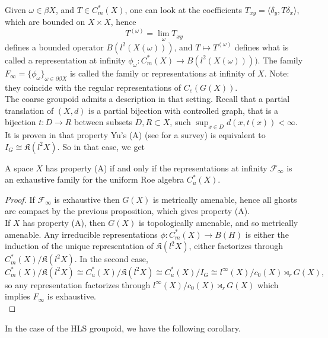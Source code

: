Given $\omega\in \beta X$, and $T\in C_m^*(X)$, one can look at the coefficients $T_{xy}= \langle \delta_y, T\delta_x\rangle$, which are bounded on $X\times X$, hence 
\[T^{(\omega)}=\lim_{\omega} T_{xy}\]
defines a bounded operator $B(l^2(X(\omega)))$, and $T\mapsto T^{(\omega)}$ defines what is called a representation at infinity $\phi_\omega : C_m^*(X)\rightarrow B(l^2(X(\omega))))$. The family $F_\infty=\{\phi_{\omega}\}_{\omega\in \partial \beta X}$ is called the family or representations at infinity of $X$. Note: they coincide with the regular representations of $C_c(G(X))$. \\

The coarse groupoid admits a description in that setting. Recall that a partial translation of $(X,d)$ is a partial bijection with controlled graph, that is a bijection $t: D\rightarrow R$ between subsets $D,R\subset X$, such $\sup_{x\in D} d(x,t(x))<\infty$. \\ 

It is proven in \cite{roe2014ghostbusting} that property Yu's (A) (see \cite{nowak2008property} for a survey) is equivalent to $I_G\cong \mathfrak K(l^2X)$. So in that case, we get
\begin{cor}
A space $X$ has property (A) if and only if the representations at infinity $\mathcal F_\infty$ is an exhaustive family for the uniform Roe algebra $C^*_u(X)$.
\end{cor}

\begin{proof}
If $\mathcal F_\infty$ is exhaustive then $G(X)$ is metrically amenable, hence all ghosts are compact by the previous proposition, which gives property (A).\\
If $X$ has property (A), then $G(X)$ is topologically amenable, and so metrically amenable. Any irreducible representations $\phi: C^*_m(X)\rightarrow B(H)$ is either the induction of the unique representation of $\mathfrak K(l^2X)$, either factorizes through $C^*_m(X)/\mathfrak K(l^2 X)$. In the second case, 
\[C^*_m(X)/\mathfrak K(l^2 X) \cong C^*_u(X) / \mathfrak K(l^2 X) \cong C^*_u(X) / I_G \cong l^\infty(X)/c_0(X) \rtimes_r G(X), \]
so any representation factorizes through $l^\infty(X)/c_0(X) \rtimes_r G(X)$ which implies $F_\infty $ is exhaustive.\\
\end{proof}

In the case of the HLS groupoid, we have the following corollary.

